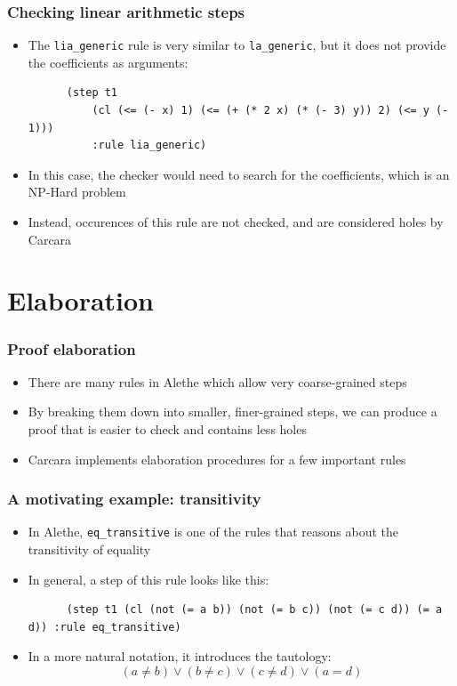 \documentclass[usepdftitle=false,aspectratio=169]{beamer}
\newcommand\vitem{\vfill\item}
\begin{document}
\begin{frame}[fragile]
  \frametitle{Checking linear arithmetic steps}
  \begin{itemize}
    \item The \texttt{lia\_generic} rule is very similar to
    \texttt{la\_generic}, but it does not provide the coefficients as arguments:
    \begin{verbatim}
      (step t1
          (cl (<= (- x) 1) (<= (+ (* 2 x) (* (- 3) y)) 2) (<= y (- 1)))
          :rule lia_generic)
    \end{verbatim}
    \vitem In this case, the checker would need to search for the coefficients,
    which is an NP-Hard problem
    \vitem Instead, occurences of this rule are not checked, and are considered
    holes by Carcara
  \end{itemize}
\end{frame}

\section{Elaboration}

\begin{frame}
  \frametitle{Proof elaboration}
  \begin{itemize}
    \item There are many rules in Alethe which allow very coarse-grained steps
    \vitem By breaking them down into smaller, finer-grained steps, we can
    produce a proof that is easier to check and contains less holes
    \vitem Carcara implements elaboration procedures for a few important rules
  \end{itemize}
\end{frame}

\begin{frame}[fragile]
  \frametitle{A motivating example: transitivity}
  \begin{itemize}
    \item In Alethe, \texttt{eq\_transitive} is one of the rules that reasons
    about the transitivity of equality
    \vitem In general, a step of this rule looks like this:
    \begin{verbatim}
      (step t1 (cl (not (= a b)) (not (= b c)) (not (= c d)) (= a d)) :rule eq_transitive)
    \end{verbatim}
    \vitem In a more natural notation, it introduces the tautology:
    $$(a \neq b) \lor (b \neq c) \lor (c \neq d) \lor (a = d)$$
  \end{itemize}
\end{frame}
\end{document}

